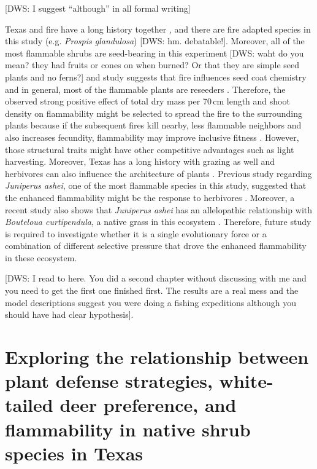 \documentclass[12pt]{report}
\begin{document}
[DWS: I suggest ``although'' in all formal writing]

Texas and fire have a long history together \citep{moir1982firehistory, stambaugh2011firehistory,stambaugh2014historicalfirehistory,smeins2005historyoffire1}, and there are fire adapted species in this study (e.g. \emph{Prospis glandulosa}) \citep{glandulosahoney,wright1976effect} [DWS: hm. debatable!]. Moreover, all of the most flammable shrubs are seed-bearing in this experiment [DWS: waht do you mean? they had fruits or cones on when burned? Or that they are simple seed plants and no ferns?] and study suggests that fire influences seed coat chemistry \citep{mcinnes2022doesseedcoatchemistry} and in general, most of the flammable plants are reseeders \citep{midgley2011pushingreseeders}. Therefore,  the observed strong positive effect of total dry mass per 70\,cm length and shoot density on flammability might be selected to spread the fire to the surrounding plants because if the subsequent fires kill nearby, less flammable neighbors and also increases fecundity, flammability may improve inclusive fitness \citep{bond1995kill}. However, those structural traits might have other competitive advantages such as light harvesting. Moreover, Texas has a long history with grazing as well and herbivores can also influence the architecture of plants \citep{danell1994browseeffects}. Previous study regarding \emph{Juniperus ashei}, one of the most flammable species in this study, suggested that the enhanced flammability might be the response to herbivores \citep{owens1998seasonal}. Moreover, a recent study also shows that \emph{Juniperus ashei} has an allelopathic relationship with \emph{Bouteloua curtipendula}, a native grass in this ecosystem \citep{young2009assessmentallelopathy}. Therefore, future study is required to investigate whether it is a single evolutionary force or a combination of different selective pressure that drove the enhanced flammability in these ecosystem.

[DWS: I read to here. You did a second chapter without discussing with me and you need to get the first one finished first. The results are a real mess and the model descriptions suggest you were doing a fishing expeditions although you should have had clear hypothesis].

\chapter{Exploring the relationship between plant defense strategies, white-tailed deer preference, and flammability in native shrub species in Texas} 
\end{document}
